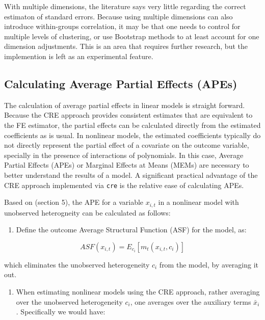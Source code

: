 \documentclass[bib]{statapress}
\providecommand{\tightlist}{%
  \setlength{\itemsep}{0pt}\setlength{\parskip}{0pt}}\usepackage{longtable,booktabs,array}
\begin{document}
With multiple dimensions, the literature says very little regarding the
correct estimaton of standard errors. Because using multiple dimensions
can also introduce within-groups correlation, it may be that one needs
to control for multiple levels of clustering, or use Bootstrap methods
to at least account for one dimension adjustments. This is an area that
requires further research, but the implemention is left as an
experimental feature.

\subsection{Calculating Average Partial Effects (APEs)}\label{sec-2-4}

The calculation of average partial effects in linear models is straight
forward. Because the CRE approach provides consistent estimates that are
equivalent to the FE estimator, the partial effects can be calculated
directly from the estimated coefficients as is usual. In nonlinear
models, the estimated coefficients typically do not directly represent
the partial effect of a covariate on the outcome variable, specially in
the presence of interactions of polynomials. In this case, Average
Partial Effects (APEs) or Marginal Effects at Means (MEMs) are necessary
to better understand the results of a model. A significant practical
advantage of the CRE approach implemented via \texttt{cre} is the
relative ease of calculating APEs.

Based on \citet{wooldridge2019} (section 5), the APE for a variable
\(x_{i,t}\) in a nonlinear model with unobserved heterogneity can be
calculated as follows:

\begin{enumerate}
\def\labelenumi{\arabic{enumi}.}
\tightlist
\item
  Define the outcome Average Structural Function (ASF) for the model,
  as:
\end{enumerate}

\[ASF(x_{i,t}) = E_{c_i}[m_t(x_{i,t}, c_i)]\]

which eliminates the unobserved heterogeneity \(c_i\) from the model, by
averaging it out.

\begin{enumerate}
\def\labelenumi{\arabic{enumi}.}
\setcounter{enumi}{1}
\tightlist
\item
  When estimating nonlinear models using the CRE approach, rather
  averaging over the unobserved heterogeneity \(c_i\), one averages over
  the auxiliary terms \(\bar x_i\). Specifically we would have:
\end{enumerate}
\end{document}
